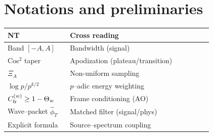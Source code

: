 \section{Notations and preliminaries}
\begin{center}
\begin{tabular}{p{0.28\linewidth} p{0.64\linewidth}}
\hline
\textbf{NT} & \textbf{Cross reading} \\\hline
Band $[-A,A]$ & Bandwidth (signal) \\
Cos$^2$ taper & Apodization (plateau/transition) \\
$\Xi_A$ & Non-uniform sampling \\
$\log p/p^{k/2}$ & $p$–adic energy weighting \\
$C_{\mathrm{fr}}^{(w)}\ge 1-\Theta_w$ & Frame conditioning (AO) \\
Wave–packet $\hat\phi_T$ & Matched filter (signal/phys) \\
Explicit formula & Source–spectrum coupling \\
\hline
\end{tabular}
\end{center}
